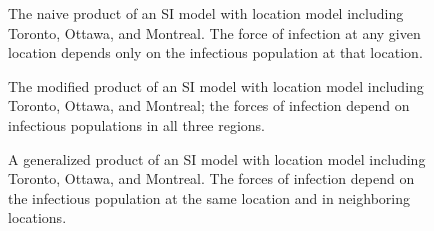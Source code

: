 \FloatBarrier

\begin{figure}
    \centering
    
    \caption{The naive product of an SI model with location model including Toronto, Ottawa, and Montreal. The force of infection at any given location depends only on the infectious population at that location.}
    \label{fig:spat_n}
\end{figure}

\begin{figure}
    \centering
    
    \caption{The modified product of an SI model with location model including Toronto, Ottawa, and Montreal; the forces of infection depend on infectious populations in all three regions.}
    \label{fig:spat_m}
\end{figure}

\begin{figure}
    \centering
    
    \caption{A generalized product of an SI model with location model including Toronto, Ottawa, and Montreal. The forces of infection depend on the infectious population at the same location and in neighboring locations.}
    \label{fig:spat_g}
\end{figure}

\FloatBarrier


